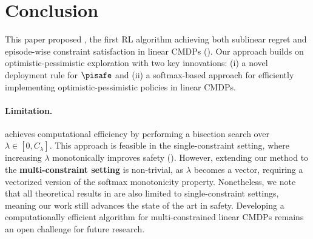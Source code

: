 \section{Conclusion}\label{sec:conclusion}

This paper proposed \MDPalgo, the first RL algorithm achieving both sublinear regret and episode-wise constraint satisfaction in linear CMDPs (). 
Our approach builds on optimistic-pessimistic exploration with two key innovations: ($\mathrm{i}$) a novel deployment rule for $\pisafe$ and ($\mathrm{ii}$) a softmax-based approach for efficiently implementing optimistic-pessimistic policies in linear CMDPs.

\paragraph{Limitation.}
\MDPalgo achieves computational efficiency by performing a bisection search over $\lambda \in [0, C_\lambda]$. 
This approach is feasible in the single-constraint setting, where increasing $\lambda$ monotonically improves safety ().
However, extending our method to the \textbf{multi-constraint setting} is non-trivial, as $\lambda$ becomes a vector, requiring a vectorized version of the softmax monotonicity property.
Nonetheless, we note that all theoretical results in  are also limited to single-constraint settings, meaning our work still advances the state of the art in safety.
Developing a computationally efficient algorithm for multi-constrained linear CMDPs remains an open challenge for future research.
